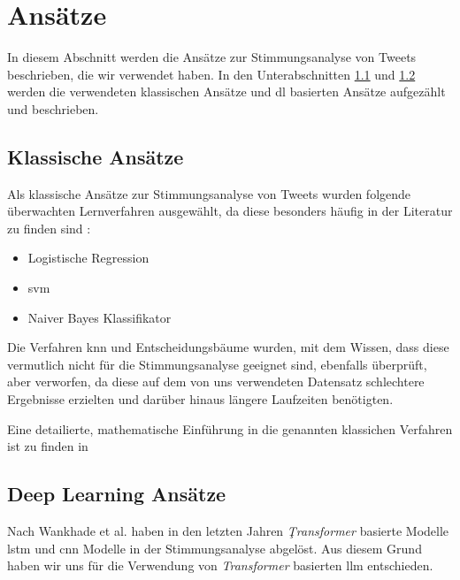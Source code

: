 \section{Ansätze}

In diesem Abschnitt werden die Ansätze zur Stimmungsanalyse von Tweets beschrieben, die wir verwendet haben.
In den Unterabschnitten \ref{subsec:klassische-ansaetze} und \ref{subsec:deep-learning-ansaetze} werden die verwendeten klassischen Ansätze und \gls{dl} basierten Ansätze aufgezählt und beschrieben.

\subsection{Klassische Ansätze}\label{subsec:klassische-ansaetze}

Als klassische Ansätze zur Stimmungsanalyse von Tweets wurden folgende überwachten Lernverfahren ausgewählt, da diese besonders häufig in der Literatur zu finden sind \cite{medhat2014sentiment, wankhade2022survey, zimbra2018state}:

\begin{itemize}
    \item Logistische Regression
    \item \gls{svm}
    \item Naiver Bayes Klassifikator
\end{itemize}

Die Verfahren \gls{knn} und Entscheidungsbäume wurden, mit dem Wissen, dass diese vermutlich nicht für die Stimmungsanalyse geeignet sind, ebenfalls überprüft, aber verworfen, da diese auf dem von uns verwendeten Datensatz schlechtere Ergebnisse erzielten und darüber hinaus längere Laufzeiten benötigten.

Eine detailierte, mathematische Einführung in die genannten klassichen Verfahren ist zu finden in \cite[vgl. die Kapitel 4.4 für logistische Regression, 4.5 und 12 für \gls{svm}, 6.6.3 für den Naiven Bayes Klassifikator, 13.3 für \gls{knn} und 9.2 für Entscheidungsbäume]{Hastie.2009}

\subsection{Deep Learning Ansätze}\label{subsec:deep-learning-ansaetze}

Nach Wankhade et al. \cite{wankhade2022survey} haben in den letzten Jahren \textit{Ţransformer} basierte Modelle \gls{lstm} und \gls{cnn} Modelle in der Stimmungsanalyse abgelöst.
Aus diesem Grund haben wir uns für die Verwendung von \textit{Transformer} basierten \gls{llm} entschieden.

